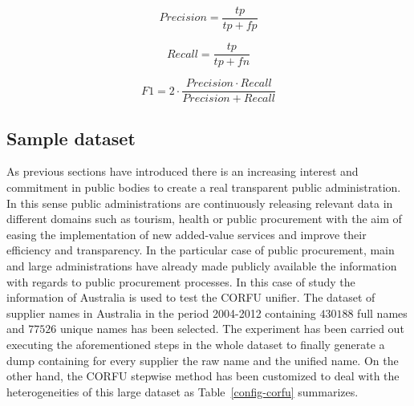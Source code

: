 \documentclass[1p,12pt]{elsarticle}
\begin{document}
\begin{figure}[ht]
	\begin{minipage}[b]{0.45\linewidth}
		\centering
		\begin{equation}\label{eq-1}
			Precision = \frac{tp}{tp+fp} 
		\end{equation}
	\end{minipage}
	\hspace{0.5cm}
	\begin{minipage}[b]{0.45\linewidth}
		\centering
		\begin{equation}\label{eq-2}
			Recall = \frac{tp}{tp+fn}
		\end{equation}
	\end{minipage}
\end{figure}


\begin{equation}\label{eq-3}
	F1 = 2 \cdot \frac{Precision \cdot Recall}{ Precision + Recall}
\end{equation}


\subsection{Sample dataset}
As previous sections have introduced there is an increasing interest and commitment 
in public bodies to create a real transparent public administration. In this sense 
public administrations are continuously releasing relevant data in different domains 
such as tourism, health or public procurement with the aim of easing the implementation 
of new added-value services and improve their efficiency and transparency. In the particular 
case of public procurement, main and large administrations have already made publicly available the information 
with regards to public procurement processes. In this case of study the information of Australia is used 
to test the CORFU unifier. The dataset of supplier names in Australia in the period 2004-2012 containing $430188$ full names 
and $77526$ unique names has been selected. The experiment has been carried out executing the aforementioned steps in the whole dataset 
to finally generate a dump containing for every supplier the raw name and the unified name. On the other hand, the CORFU stepwise method has been customized to deal with the heterogeneities of this large dataset as Table~\ref{config-corfu} summarizes.
\end{document}
